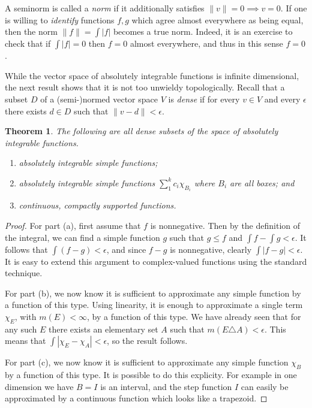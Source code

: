 \documentclass[11pt,oneside]{amsbook}
\theoremstyle{definition}
\theoremstyle{plain}
\newtheorem{thm}{Theorem}[section]
\theoremstyle{definition}
\theoremstyle{remark}
\numberwithin{equation}{section}
\numberwithin{figure}{section}
\begin{document}
A seminorm is called a \emph{norm} if it additionally satisfies $\|v\|=0\implies v=0$. If one is willing to \emph{identify} functions $f,g$ which agree almost everywhere as being equal, then the norm $\|f\|=\int|f|$ becomes a true norm. Indeed, it is an exercise to check that if $\int|f|=0$ then $f=0$ almost everywhere, and thus in this sense $f=0$.

While the vector space of absolutely integrable functions is infinite dimensional, the next result shows that it is not too unwieldy topologically. Recall that a subset $D$ of a (semi-)normed vector space $V$ is \emph{dense} if for every $v\in V$ and every $\epsilon$ there exists $d\in D$ such that $\|v-d\|<\epsilon$.

\begin{thm}
  The following are all dense subsets of the space of absolutely integrable functions.
  \begin{enumerate}
  \item absolutely integrable simple functions;
  \item absolutely integrable simple functions $\sum_1^kc_i\chi_{B_i}$ where $B_i$ are all boxes; and
  \item continuous, compactly supported functions.
  \end{enumerate}
\end{thm}

\begin{proof}
  For part (a), first assume that $f$ is nonnegative. Then by the definition of the integral, we can find a simple function $g$ such that $g\leq f$ and $\int f-\int g<\epsilon$. It follows that $\int(f-g)<\epsilon$, and since $f-g$ is nonnegative, clearly $\int|f-g|<\epsilon$. It is easy to extend this argument to complex-valued functions using the standard technique.

  For part (b), we now know it is sufficient to approximate any simple function by a function of this type. Using linearity, it is enough to approximate a single term $\chi_E$, with $m(E)<\infty$, by a function of this type. We have already seen that for any such $E$ there exists an elementary set $A$ such that $m(E\triangle A)<\epsilon$. This means that $\int|\chi_E-\chi_A|<\epsilon$, so the result follows.

  For part (c), we now know it is sufficient to approximate any simple function $\chi_B$ by a function of this type. It is possible to do this explicity. For example in one dimension we have $B=I$ is an interval, and the step function $I$ can easily be approximated by a continuous function which looks like a trapezoid.
\end{proof}
\end{document}
